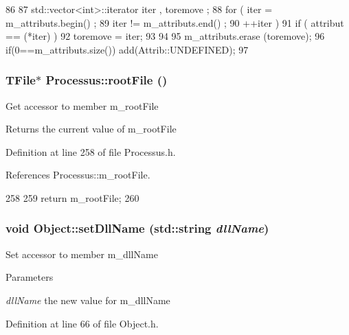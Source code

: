 \begin{DoxyCode}
86                                {
87     std::vector<int>::iterator iter , toremove ;
88     for ( iter  = m_attributs.begin() ;
89           iter != m_attributs.end()   ;
90           ++iter ) {
91       if ( attribut == (*iter) ) {
92         toremove = iter;
93       }
94     }
95     m_attributs.erase (toremove);
96     if(0==m_attributs.size()) add(Attrib::UNDEFINED);
97   }
\end{DoxyCode}
\hypertarget{classProcessus_a247e8c362ec08422cf53d08dd23b093c}{
\subsubsection[{rootFile}]{\setlength{\rightskip}{0pt plus 5cm}TFile$\ast$ Processus::rootFile ()}}
\label{classProcessus_a247e8c362ec08422cf53d08dd23b093c}
Get accessor to member m\_\-rootFile \begin{DoxyReturn}{Returns}
the current value of m\_\-rootFile 
\end{DoxyReturn}


Definition at line 258 of file Processus.h.

References Processus::m\_\-rootFile.


\begin{DoxyCode}
258                      {
259     return m_rootFile;
260   }
\end{DoxyCode}
\hypertarget{classObject_a870c5af919958c2136623b2d7816d123}{
\subsubsection[{setDllName}]{\setlength{\rightskip}{0pt plus 5cm}void Object::setDllName (std::string {\em dllName})}}
\label{classObject_a870c5af919958c2136623b2d7816d123}
Set accessor to member m\_\-dllName 
\begin{DoxyParams}{Parameters}
\item[{\em dllName}]the new value for m\_\-dllName \end{DoxyParams}


Definition at line 66 of file Object.h.

